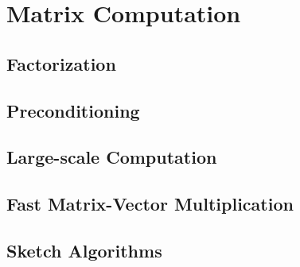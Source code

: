 \chapter{Matrix Computation}
\label{Ch: 8-Mat-Com}
\section{Factorization}

\section{Preconditioning}

\section{Large-scale Computation}

\section{Fast Matrix-Vector Multiplication}

\section{Sketch Algorithms}

